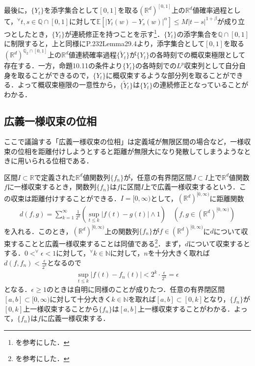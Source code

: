 \documentclass[dvipdfmx]{jsarticle}
\begin{document}
最後に，$\{Y_t\}$を添字集合として$[0,1]$を取る$(\mathbb{R}^d)^{[0,1]}$上の$\mathbb{R}^d$値確率過程として，$^\forall t,s\in\mathbb{Q}\cap [0,1]$に対して$\mathbb{E}[|Y_t(w)-Y_s(w)|^\alpha]\leq M|t-s|^{1+\beta}$が成り立つとしたとき，$\{Y_t\}$が連続修正を持つことを示す\footnote{\cite{sugiura}を参考にした．}．$\{Y_t\}$の添字集合を$\mathbb{Q}\cap [0,1]$に制限すると，上と同様に\cite{kato}P.232Lemma29.4より，添字集合として$[0,1]$を取る$(\mathbb{R}^d)^{\mathbb{Q}_2\cap [0,1]}$上の$\mathbb{R}^d$値連続確率過程$\{\widetilde{Y}_t\}$が$\{Y_t\}$の各時刻での概収束極限として存在する．一方，\cite{kotani}命題10.11の条件より$\{Y_t\}$の各時刻での$L^p$収束列として自分自身を取ることができるので，$\{Y_t\}$に概収束するような部分列を取ることができる．よって概収束極限の一意性から，$\{\widetilde{Y}_t\}$は$\{Y_t\}$の連続修正となっていることがわかる．
%
%
%
%
\subsection{広義一様収束の位相}
ここで議論する「広義一様収束の位相」は定義域が無限区間の場合など，一様収束の位相を距離付けしようとすると距離が無限大になり発散してしまうようなときに用いられる位相である．\par
区間$I\subset \mathbb{R}$で定義された$\mathbb{R}^d$値関数列$\{f_n\}$が，任意の有界閉区間$J\subset I$上で$\mathbb{R}^d$値関数$f$に一様収束するとき，関数列$\{f_n\}$は$f$に区間$I$上で広義一様収束するという．この収束は距離付けすることができる．$I=[0,\infty)$として，$(\mathbb{R}^d)^{[0,\infty)}$に距離関数
\begin{align*}
d(f,g)=\sum_{k=1}^\infty \frac{1}{2^k}\left(\sup_{t\leq k}|f(t)-g(t)|\wedge 1\right) \quad (f,g\in (\mathbb{R}^d)^{[0,\infty)})
\end{align*}
を入れる．このとき，$(\mathbb{R}^d)^{[0,\infty)}$上の関数列$\{f_n\}$が$f\in (\mathbb{R}^d)^{[0,\infty)}$に$d$について収束することと広義一様収束することは同値である\footnote{\cite{kogiichiyo1}を参考にした．}．まず，$d$について収束するとする．$0< ^\forall \epsilon<1$に対して，$^\forall k\in\mathbb{N}$に対して，$n$を十分大きく取れば$d(f,f_n)<\frac{\epsilon}{2^k}$となるので
\begin{align*}
\sup_{t\leq k}|f(t)-f_n(t)|<2^k\cdot \frac{\epsilon}{2^k}=\epsilon
\end{align*}
となる．$\epsilon\geq 1$のときは自明に同様のことが成りたつ．任意の有界閉区間$[a,b]\subset [0,\infty)$に対して十分大きく$k\in\mathbb{N}$を取れば$[a,b]\subset [0,k]$となり，$\{f_n\}$が$[0,k]$上一様収束することから$\{f_n\}$は$[a,b]$上一様収束することがわかる．よって，$\{f_n\}$は$f$に広義一様収束する．
\end{document}
